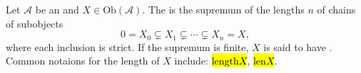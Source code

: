 
\begin{definition} \label{definition:length_of_an_object_of_an_abelian_category}
Let $\mathcal{A}$ be an  and $X \in \mathrm{Ob}(\mathcal{A})$. The  is the supremum of the lengths $n$ of chains of subobjects
\[ 0 = X_0 \subsetneq X_1 \subsetneq \cdots \subsetneq X_n = X, \]
where each inclusion is strict. If the supremum is finite, $X$ is said to have .
Common notaions for the length of $X$ include: \hl{$\mathrm{length} X$}, \hl{$\mathrm{len} X$}.
\end{definition}